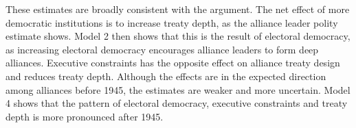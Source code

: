 \documentclass[12pt]{article}
\begin{document}
These estimates are broadly consistent with the argument. 
The net effect of more democratic institutions is to increase treaty depth, as the alliance leader polity estimate shows. 
Model 2 then shows that this is the result of electoral democracy, as increasing electoral democracy encourages alliance leaders to form deep alliances. 
Executive constraints has the opposite effect on alliance treaty design and reduces treaty depth. 
Although the effects are in the expected direction among alliances before 1945, the estimates are weaker and more uncertain. 
Model 4 shows that the pattern of electoral democracy, executive constraints and treaty depth is more pronounced after 1945. 


\begin{table}[!htbp] \centering 
\end{table}
\end{document}
